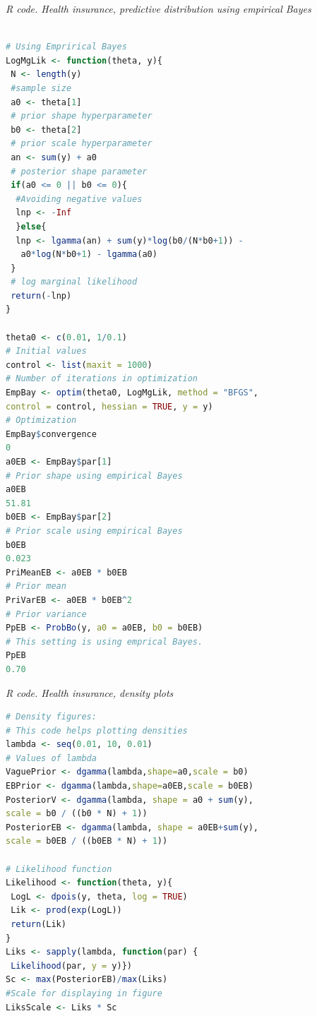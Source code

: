 \begin{tcolorbox}[enhanced,width=4.67in,center upper,
	fontupper=\large\bfseries,drop shadow southwest,sharp corners]
\textit{R code. Health insurance, predictive distribution using empirical Bayes}
\begin{VF}
\begin{lstlisting}[basicstyle=\footnotesize, language=R]
	
# Using Emprirical Bayes
LogMgLik <- function(theta, y){
 N <- length(y) 
 #sample size
 a0 <- theta[1] 
 # prior shape hyperparameter
 b0 <- theta[2] 
 # prior scale hyperparameter
 an <- sum(y) + a0 
 # posterior shape parameter
 if(a0 <= 0 || b0 <= 0){ 
  #Avoiding negative values
  lnp <- -Inf
  }else{
  lnp <- lgamma(an) + sum(y)*log(b0/(N*b0+1)) -
   a0*log(N*b0+1) - lgamma(a0)
 } 
 # log marginal likelihood
 return(-lnp)
}
			
theta0 <- c(0.01, 1/0.1) 
# Initial values
control <- list(maxit = 1000) 
# Number of iterations in optimization
EmpBay <- optim(theta0, LogMgLik, method = "BFGS", 
control = control, hessian = TRUE, y = y) 
# Optimization
EmpBay$convergence
0
a0EB <- EmpBay$par[1] 
# Prior shape using empirical Bayes
a0EB
51.81
b0EB <- EmpBay$par[2] 
# Prior scale using empirical Bayes
b0EB
0.023
PriMeanEB <- a0EB * b0EB 
# Prior mean
PriVarEB <- a0EB * b0EB^2 
# Prior variance
PpEB <- ProbBo(y, a0 = a0EB, b0 = b0EB) 
# This setting is using emprical Bayes.
PpEB
0.70 
\end{lstlisting}
\end{VF}
\end{tcolorbox} 

\begin{tcolorbox}[enhanced,width=4.67in,center upper,
	fontupper=\large\bfseries,drop shadow southwest,sharp corners]
	\textit{R code. Health insurance, density plots}
\begin{VF}
\begin{lstlisting}[basicstyle=\footnotesize, language=R]		
# Density figures: 
# This code helps plotting densities
lambda <- seq(0.01, 10, 0.01) 
# Values of lambda
VaguePrior <- dgamma(lambda,shape=a0,scale = b0)
EBPrior <- dgamma(lambda,shape=a0EB,scale = b0EB)
PosteriorV <- dgamma(lambda, shape = a0 + sum(y),
scale = b0 / ((b0 * N) + 1)) 
PosteriorEB <- dgamma(lambda, shape = a0EB+sum(y), 
scale = b0EB / ((b0EB * N) + 1))
			
# Likelihood function
Likelihood <- function(theta, y){
 LogL <- dpois(y, theta, log = TRUE)
 Lik <- prod(exp(LogL))
 return(Lik)
}
Liks <- sapply(lambda, function(par) {
 Likelihood(par, y = y)})
Sc <- max(PosteriorEB)/max(Liks) 
#Scale for displaying in figure
LiksScale <- Liks * Sc
\end{lstlisting}
\end{VF}
\end{tcolorbox} 

